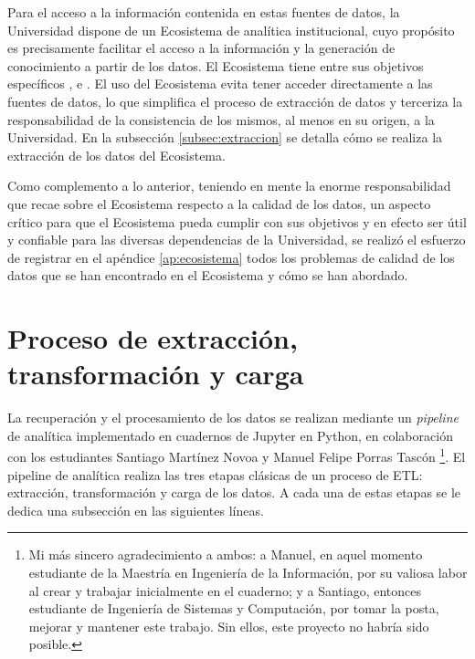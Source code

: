 Para el acceso a la información contenida en estas fuentes de datos, la Universidad dispone de un Ecosistema de analítica institucional, cuyo propósito es precisamente facilitar el acceso a la información y la generación de conocimiento a partir de los datos. El Ecosistema tiene entre sus objetivos específicos ,  e  \cite{ecosistema}. El uso del Ecosistema evita tener acceder directamente a las fuentes de datos, lo que simplifica el proceso de extracción de datos y terceriza la responsabilidad de la consistencia de los mismos, al menos en su origen, a la Universidad. En la subsección \ref{subsec:extraccion} se detalla cómo se realiza la extracción de los datos del Ecosistema.

Como complemento a lo anterior, teniendo en mente la enorme responsabilidad que recae sobre el Ecosistema respecto a la calidad de los datos, un aspecto crítico para que el Ecosistema pueda cumplir con sus objetivos y en efecto ser útil y confiable para las diversas dependencias de la Universidad, se realizó el esfuerzo de registrar en el apéndice \ref{ap:ecosistema} todos los problemas de calidad de los datos que se han encontrado en el Ecosistema y cómo se han abordado.

\section{Proceso de extracción, transformación y carga}

La recuperación y el procesamiento de los datos se realizan mediante un \textit{pipeline} de analítica implementado en cuadernos de \gls{Jupyter} en \gls{Python}, en colaboración con los estudiantes Santiago Martínez Novoa y Manuel Felipe Porras Tascón
\footnote{Mi más sincero agradecimiento a ambos: a Manuel, en aquel momento estudiante de la Maestría en Ingeniería de la Información, por su valiosa labor al crear y trabajar inicialmente en el cuaderno; y a Santiago, entonces estudiante de Ingeniería de Sistemas y Computación, por tomar la posta, mejorar y mantener este trabajo. Sin ellos, este proyecto no habría sido posible.}.
El pipeline de analítica realiza las tres etapas clásicas de un proceso de \gls{ETL}: extracción, transformación y carga de los datos. A cada una de estas etapas se le dedica una subsección en las siguientes líneas.


